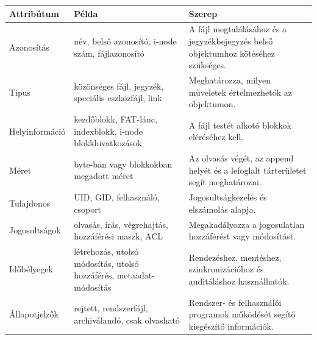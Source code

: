 \begin{tabularx}{\textwidth}{L{30mm}X X}
\toprule
\textbf{Attribútum} & \textbf{Példa} & \textbf{Szerep} \\
\midrule
Azonosítás & név, belső azonosító, i-node szám, fájlazonosító & A fájl megtalálásához és a jegyzékbejegyzés belső objektumhoz kötéséhez szükséges. \\
Típus & közönséges fájl, jegyzék, speciális eszközfájl, link & Meghatározza, milyen műveletek értelmezhetők az objektumon. \\
Helyinformáció & kezdőblokk, FAT-lánc, indexblokk, i-node blokkhivatkozások & A fájl testét alkotó blokkok eléréséhez kell. \\
Méret & byte-ban vagy blokkokban megadott méret & Az olvasás végét, az append helyét és a lefoglalt tárterületet segít meghatározni. \\
Tulajdonos & UID, GID, felhasználó, csoport & Jogosultságkezelés és elszámolás alapja. \\
Jogosultságok & olvasás, írás, végrehajtás, hozzáférési maszk, ACL & Megakadályozza a jogosulatlan hozzáférést vagy módosítást. \\
Időbélyegek & létrehozás, utolsó módosítás, utolsó hozzáférés, metaadat-módosítás & Rendezéshez, mentéshez, szinkronizációhoz és auditáláshoz használhatók. \\
Állapotjelzők & rejtett, rendszerfájl, archiválandó, csak olvasható & Rendszer- és felhasználói programok működését segítő kiegészítő információk. \\
\bottomrule
\end{tabularx}

